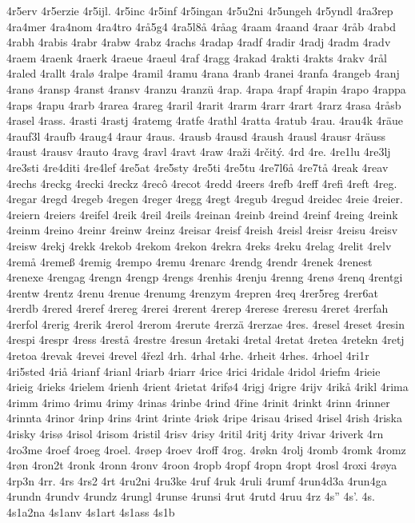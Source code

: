 4r5erv
4r5erzie
4r5ijl.
4r5inc
4r5inf
4r5ingan
4r5u2ni
4r5ungeh
4r5yndl
4ra3rep
4ra4mer
4ra4nom
4ra4tro
4rå5g4
4ra5l8å
4råag
4raam
4raand
4raar
4råb
4rabd
4rabh
4rabis
4rabr
4rabw
4rabz
4rachs
4radap
4radf
4radir
4radj
4radm
4radv
4raem
4raenk
4raerk
4raeue
4raeul
4raf
4ragg
4rakad
4rakti
4rakts
4rakv
4rål
4raled
4rallt
4ralø
4ralpe
4ramil
4ramu
4rana
4ranb
4ranei
4ranfa
4rangeb
4ranj
4ranø
4ransp
4ranst
4ransv
4ranzu
4ranzü
4rap.
4rapa
4rapf
4rapin
4rapo
4rappa
4raps
4rapu
4rarb
4rarea
4rareg
4raril
4rarit
4rarm
4rarr
4rart
4rarz
4rasa
4råsb
4rasel
4rass.
4rasti
4rastj
4ratemg
4ratfe
4rathl
4ratta
4ratub
4rau.
4rau4k
4räue
4rauf3l
4raufb
4raug4
4raur
4raus.
4rausb
4rausd
4raush
4rausl
4rausr
4räuss
4raust
4rausv
4rauto
4ravg
4ravl
4ravt
4raw
4raži
4rčitý.
4rd
4re.
4re1lu
4re3lj
4re3sti
4re4diti
4re4lef
4re5at
4re5sty
4re5ti
4re5tu
4re7l6å
4re7tå
4reak
4reav
4rechs
4reckg
4recki
4reckz
4recô
4recot
4redd
4reers
4refb
4reff
4refi
4reft
4reg.
4regar
4regd
4regeb
4regen
4reger
4regg
4regt
4regub
4regud
4reidec
4reie
4reier.
4reiern
4reiers
4reifel
4reik
4reil
4reils
4reinan
4reinb
4reind
4reinf
4reing
4reink
4reinm
4reino
4reinr
4reinw
4reinz
4reisar
4reisf
4reish
4reisl
4reisr
4reisu
4reisv
4reisw
4rekj
4rekk
4rekob
4rekom
4rekon
4rekra
4reks
4reku
4relag
4relit
4relv
4remå
4remeß
4remig
4rempo
4remu
4renarc
4rendg
4rendr
4renek
4renest
4renexe
4rengag
4rengn
4rengp
4rengs
4renhis
4renju
4renng
4renø
4renq
4rentgi
4rentw
4rentz
4renu
4renue
4renumg
4renzym
4repren
4req
4rer5reg
4rer6at
4rerdb
4rered
4reref
4rereg
4rerei
4rerent
4rerep
4rerese
4reresu
4reret
4rerfah
4rerfol
4rerig
4rerik
4rerol
4rerom
4rerute
4rerzä
4rerzae
4res.
4resel
4reset
4resin
4respi
4respr
4ress
4restå
4restre
4resun
4retaki
4retal
4retat
4retea
4retekn
4retj
4retoa
4revak
4revei
4revel
4řezl
4rh.
4rhal
4rhe.
4rheit
4rhes.
4rhoel
4ri1r
4ri5sted
4riå
4rianf
4rianl
4riarb
4riarr
4rice
4rici
4ridale
4ridol
4riefm
4rieie
4rieig
4rieks
4rielem
4rienh
4rient
4rietat
4rifø4
4rigj
4rigre
4rijv
4rikå
4rikl
4rima
4rimm
4rimo
4rimu
4rimy
4rinas
4rinbe
4rind
4řine
4rinit
4rinkt
4rinn
4rinner
4rinnta
4rinor
4rinp
4rins
4rint
4rinte
4riøk
4ripe
4risau
4rised
4risel
4rish
4riska
4risky
4risø
4risol
4risom
4ristil
4risv
4risy
4ritil
4ritj
4rity
4rivar
4riverk
4rn
4ro3me
4roef
4roeg
4roel.
4røep
4roev
4roff
4rog.
4røkn
4rolj
4romb
4romk
4romz
4røn
4ron2t
4ronk
4ronn
4ronv
4roon
4ropb
4ropf
4ropn
4ropt
4rosl
4roxi
4røya
4rp3n
4rr.
4rs
4rs2
4rt
4ru2ni
4ru3ke
4ruf
4ruk
4ruli
4rumf
4run4d3a
4run4ga
4rundn
4rundv
4rundz
4rungl
4runse
4runsi
4rut
4rutd
4ruu
4rz
4s''
4s'.
4s.
4s1a2na
4s1anv
4s1art
4s1ass
4s1b
